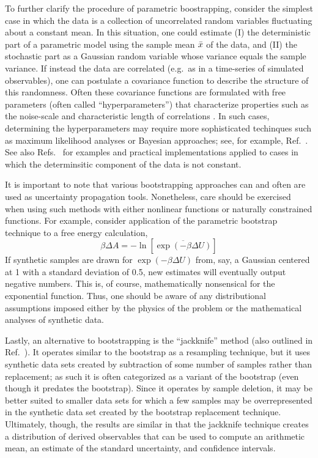 To further clarify the procedure of parametric boostrapping, consider the simplest case in which the data is a collection of uncorrelated random variables fluctuating about a constant mean.  In this situation, one could estimate (I) the deterministic part of a parametric model using the sample mean $\bar{x}$ of the data, and (II) the stochastic part as a Gaussian random variable whose variance equals the sample variance.  If instead the data are correlated (e.g.\ as in a time-series of simulated observables),  one can postulate a covariance function to describe the structure of this randomness.  Often these covariance functions are formulated with free parameters (often called ``hyperparameters'') that characterize properties such as the noise-scale and characteristic length of correlations \cite{Rasmussen}.  In such cases, determining the hyperparameters may require more sophisticated techinques such as maximum likelihood analyses or Bayesian approaches; see, for example, Ref.~\cite{Rasmussen}.  See also Refs.~\cite{patrone1,patrone2,patrone3} for examples and practical implementations applied to cases in which the determinsitic component of the data is not constant.

It is important to note that various bootstrapping approaches can and often are used as uncertainty propagation tools.  Nonetheless, care should be exercised when using such methods with either nonlinear functions or naturally constrained functions.  For example, consider application of the parametric bootstrap technique to a free energy calculation,
%
\begin{equation}
  \beta \Delta A = - \ln \left[ \overline{\exp\left(-\beta \Delta U\right)} \right]
\end{equation}
%
If synthetic samples are drawn for $\exp(-\beta \Delta U)$ from, say, a Gaussian centered at 1 with a standard deviation of 0.5, new estimates will eventually output negative numbers. This is, of course, mathematically nonsensical for the exponential function.  Thus, one should be aware of any distributional assumptions imposed either by the physics of the problem or the mathematical analyses of synthetic data.

Lastly, an alternative to bootstrapping is the ``jackknife'' method \cite{Quenouille_Approximate_1949,Quenouille_Notes_1956,Tukey_Bias_1958} (also outlined in Ref.~\cite{Tibshirani1998}). It operates similar to the bootstrap as a resampling technique, but it uses synthetic data sets created by subtraction of some number of samples rather than replacement; as such it is often categorized as a variant of the bootstrap (even though it predates the bootstrap). Since it operates by sample deletion, it may be better suited to smaller data sets for which a few samples may be overrepresented in the synthetic data set created by the bootstrap replacement technique. Ultimately, though, the results are similar in that the jackknife technique creates a distribution of derived observables that can be used to compute an arithmetic mean, an estimate of the standard uncertainty, and confidence intervals.

